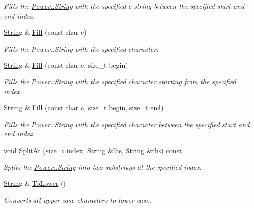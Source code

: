 \begin{DoxyCompactItemize}
\begin{DoxyCompactList}\small\item\em Fills the \hyperlink{class_power_1_1_string}{Power\+::\+String} with the specified c-\/string between the specified start and end index. \end{DoxyCompactList}\item 
\hyperlink{class_power_1_1_string}{String} \& \hyperlink{class_power_1_1_string_a4f2b074b5fc10cad59a929dcfb158fc2}{Fill} (const char c)
\begin{DoxyCompactList}\small\item\em Fills the \hyperlink{class_power_1_1_string}{Power\+::\+String} with the specified character. \end{DoxyCompactList}\item 
\hyperlink{class_power_1_1_string}{String} \& \hyperlink{class_power_1_1_string_ae8e44083b582d9409d9129d5282e19c3}{Fill} (const char c, size\+\_\+t begin)
\begin{DoxyCompactList}\small\item\em Fills the \hyperlink{class_power_1_1_string}{Power\+::\+String} with the specified character starting from the specified index. \end{DoxyCompactList}\item 
\hyperlink{class_power_1_1_string}{String} \& \hyperlink{class_power_1_1_string_af62ccb89f536814db9d86b8c7a1c4eed}{Fill} (const char c, size\+\_\+t begin, size\+\_\+t end)
\begin{DoxyCompactList}\small\item\em Fills the \hyperlink{class_power_1_1_string}{Power\+::\+String} with the specified character between the specified start and end index. \end{DoxyCompactList}\item 
void \hyperlink{class_power_1_1_string_a7009c79c7fa9b393fdbbc1922b14403a}{Split\+At} (size\+\_\+t index, \hyperlink{class_power_1_1_string}{String} \&lhs, \hyperlink{class_power_1_1_string}{String} \&rhs) const
\begin{DoxyCompactList}\small\item\em Splits the \hyperlink{class_power_1_1_string}{Power\+::\+String} into two substrings at the specified index. \end{DoxyCompactList}\item 
\hyperlink{class_power_1_1_string}{String} \& \hyperlink{class_power_1_1_string_aa0e68c88cb84dfa1142a20d2e0d59b3e}{To\+Lower} ()
\begin{DoxyCompactList}\small\item\em Converts all upper case characters to lower case. \end{DoxyCompactList}\item 

\end{DoxyCompactItemize}
